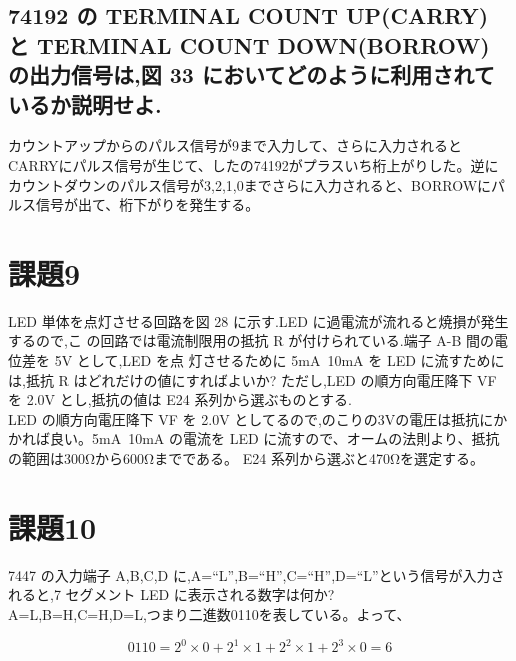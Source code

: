 \documentclass[xelatex,ja=standard,jafont=noto]{bxjsarticle}
\begin{document}
\subsection{74192 の TERMINAL COUNT UP(CARRY) と TERMINAL COUNT DOWN(BORROW)
の出力信号は,図 33 においてどのように利用されているか説明せよ.}


カウントアップからのパルス信号が9まで入力して、さらに入力されるとCARRYにパルス信号が生じて、したの74192がプラスいち桁上がりした。逆にカウントダウンのパルス信号が3,2,1,0までさらに入力されると、BORROWにパルス信号が出て、桁下がりを発生する。






\iffalse
ここでコメント
\fi






\section{課題9}
LED 単体を点灯させる回路を図 28 に示す.LED に過電流が流れると焼損が発生するので,こ
の回路では電流制限用の抵抗 R が付けられている.端子 A-B 間の電位差を 5V として,LED を点
灯させるために 5mA~10mA を LED に流すためには,抵抗 R はどれだけの値にすればよいか?
ただし,LED の順方向電圧降下 VF を 2.0V とし,抵抗の値は E24 系列から選ぶものとする.\\


LED の順方向電圧降下 VF を 2.0V としてるので,のこりの3Vの電圧は抵抗にかかれば良い。5mA~10mA の電流を LED に流すので、オームの法則より、抵抗の範囲は300Ωから600Ωまでである。 E24 系列から選ぶと470Ωを選定する。





\iffalse
ここでコメント
\fi






\newpage

\section{課題10}
7447 の入力端子 A,B,C,D に,A=“L”,B=“H”,C=“H”,D=“L”という信号が入力さ
れると,7 セグメント LED に表示される数字は何か?\\
A=L,B=H,C=H,D=L,つまり二進数0110を表している。よって、

 \begin{equation}
		 0110=2^{0}\times0+2^{1}\times1+2^{2}\times1+2^{3}\times0=6
　\end{equation}



\end{document}
